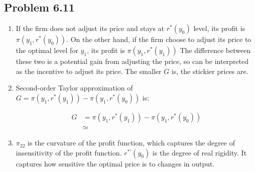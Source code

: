 \documentclass[11pt]{amsart}
\begin{document}
\subsection{Problem 6.11}
\begin{enumerate}[label = (\alph*)]
	\item If the firm does not adjust its price and stays at $r^{*}(y_0)$ level, its profit is $\pi \left( y_1, r^{*}(y_0)  \right)$. On the other hand, if the firm choose to adjust its price to the optimal level for $y_1$, its profit is $\pi \left( y_1, r^{*}(y_1)  \right)$ The difference between these two is a potential gain from adjusting the price, so can be interpreted as the incentive to adjust its price. The smaller $G$ is, the stickier prices are. 
	
	\item Second-order Taylor approximation of $G = \pi \left( y_1, r^{*}(y_1)  \right) - \pi \left( y_1, r^{*}(y_0)  \right)$ is: 
	
	\begin{align*}
	G &= \pi \left( y_1, r^{*}(y_1)  \right) - \pi \left( y_1, r^{*}(y_0)  \right) \\
	 & \simeq 
	\end{align*}
	\item $\pi_{22}$ is the curvature of the profit function, which captures the degree of insensitivity of the profit function. $r^{*'}(y_0)$ is the degree of real rigidity. It captures how sensitive the optimal price is to changes in output. 
\end{enumerate}
\end{document}
